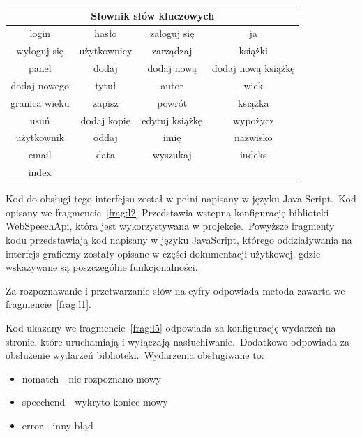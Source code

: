 \begin{table}[H]
    \centering
    \label{tab:keys}
\begin{tabular}{|c|c|c|c|} \hline
    \multicolumn{4}{|c|}{\textbf{Słownik słów kluczowych}} \\ \hline
    login & hasło & zaloguj się & ja \\ \hline
    wyloguj się & użytkownicy & zarządzaj & książki \\ \hline
    panel & dodaj & dodaj nową & dodaj nową książkę \\ \hline
    dodaj nowego & tytuł & autor & wiek \\ \hline
    granica wieku & zapisz & powrót & książka \\ \hline
    usuń & dodaj kopię & edytuj książkę & wypożycz \\ \hline
    użytkownik & oddaj & imię & nazwisko \\ \hline
    email & data & wyszukaj & indeks \\ \hline
    index & & & \\ \hline
\end{tabular}
\end{table}

Kod do obsługi tego interfejsu został w pełni napisany w języku Java Script.\ Kod opisany we fragmencie~\ref{frag:l2} Przedstawia wstępną konfigurację biblioteki WebSpeechApi, która jest wykorzystywana w projekcie.\ Powyższe fragmenty kodu przedstawiają kod napisany w języku JavaScript, którego oddziaływania na interfejs graficzny zostały opisane w części dokumentacji użytkowej, gdzie wskazywane są poszczególne funkcjonalności.



Za rozpoznawanie i przetwarzanie słów na cyfry odpowiada metoda zawarta we fragmencie~\ref{frag:l1}.


Kod ukazany we fragmencie~\ref{frag:l5} odpowiada za konfigurację wydarzeń na stronie, które uruchamiają i wyłączają nasłuchiwanie.\ Dodatkowo odpowiada za obsłużenie wydarzeń biblioteki.\ Wydarzenia obsługiwane to:
\begin{itemize}
\item nomatch - nie rozpoznano mowy
\item speechend - wykryto koniec mowy
\item error - inny błąd
\end{itemize}

